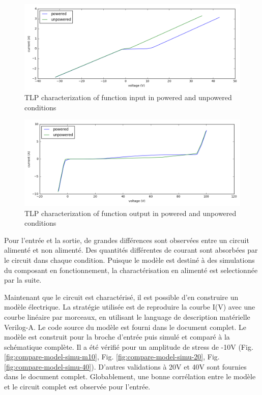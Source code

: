 \begin{figure}[!h]
  \centering
  \includegraphics[width=\textwidth]{src/1/figures/tlp_input_characterization.png}
  \caption{TLP characterization of function input in powered and unpowered conditions}
  \label{fig:tlp-input-cz}
\end{figure}

\begin{figure}[!h]
  \centering
  \includegraphics[width=\textwidth]{src/1/figures/tlp_output_characterization.png}
  \caption{TLP characterization of function output in powered and unpowered conditions}
  \label{fig:tlp-output-cz}
\end{figure}

Pour l'entrée et la sortie, de grandes différences sont observées entre un circuit alimenté et non alimenté.
Des quantités différentes de courant sont absorbées par le circuit dans chaque condition.
Puisque le modèle est destiné à des simulations du composant en fonctionnement, la charactérisation en alimenté est selectionnée par la suite.

Maintenant que le circuit est charactérisé, il est possible d'en construire un modèle électrique.
La stratégie utilisée est de reproduire la courbe I(V) avec une courbe linéaire par morceaux, en utilisant le language de description matérielle Verilog-A.
Le code source du modèle est fourni dans le document complet.
Le modèle est construit pour la broche d'entrée puis simulé et comparé à la schématique complète.
Il a été vérifié pour un amplitude de stress de -10V (Fig. \ref{fig:compare-model-simu-m10}, Fig. \ref{fig:compare-model-simu-20}, Fig. \ref{fig:compare-model-simu-40}).
D'autres validations à 20V et 40V sont fournies dans le document complet.
Globablement, une bonne corrélation entre le modèle et le circuit complet est observée pour l'entrée.

